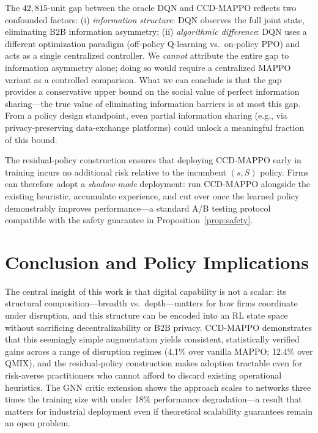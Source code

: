 \documentclass[11pt,a4paper]{article}
\theoremstyle{plain}
\theoremstyle{definition}
\begin{document}
The $42{,}815$-unit gap between the oracle DQN and CCD-MAPPO reflects two confounded
factors: (i) \emph{information structure}: DQN observes the full joint state, eliminating
B2B information asymmetry; (ii) \emph{algorithmic difference}: DQN uses a different
optimization paradigm (off-policy Q-learning vs.\ on-policy PPO) and acts as a single
centralized controller.  We \emph{cannot} attribute the entire gap to information
asymmetry alone; doing so would require a centralized MAPPO variant as a controlled
comparison.  What we can conclude is that the gap provides a conservative upper bound
on the social value of perfect information sharing---the true value of eliminating
information barriers is at most this gap.  From a policy design standpoint, even partial
information sharing (e.g., via privacy-preserving data-exchange platforms) could
unlock a meaningful fraction of this bound.

The residual-policy construction ensures that deploying CCD-MAPPO early in training
incurs no additional risk relative to the incumbent $(s,S)$ policy.  Firms can therefore
adopt a \emph{shadow-mode} deployment: run CCD-MAPPO alongside the existing heuristic,
accumulate experience, and cut over once the learned policy demonstrably improves
performance—a standard A/B testing protocol compatible with the safety guarantee in
Proposition~\ref{prop:safety}.

\section{Conclusion and Policy Implications}
\label{sec:conclusion}

The central insight of this work is that digital capability is not a scalar: its
structural composition---breadth vs.\ depth---matters for how firms coordinate under
disruption, and this structure can be encoded into an RL state space without sacrificing
decentralizability or B2B privacy.  CCD-MAPPO demonstrates that this seemingly simple
augmentation yields consistent, statistically verified gains across a range of disruption
regimes (4.1\% over vanilla MAPPO; 12.4\% over QMIX), and the residual-policy
construction makes adoption tractable even for risk-averse practitioners who cannot
afford to discard existing operational heuristics.  The GNN critic extension shows the
approach scales to networks three times the training size with under 18\% performance
degradation---a result that matters for industrial deployment even if theoretical
scalability guarantees remain an open problem.
\end{document}
